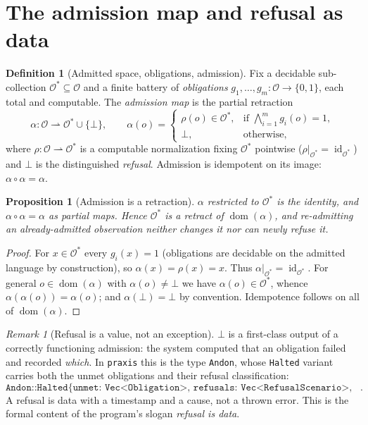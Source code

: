 \documentclass[11pt,oneside]{book}
\theoremstyle{definition}
\newtheorem{definition}{Definition}[chapter]
\theoremstyle{plain}
\newtheorem{proposition}[theorem]{Proposition}
\theoremstyle{remark}
\newtheorem*{remark}{Remark}
\newcommand{\Obs}{\mathcal{O}}                 %
\newcommand{\Adm}{\mathcal{O}^{*}}             %
\newcommand{\adm}{\alpha}                      %
\newcommand{\Rfsl}{\bot}                        %
\DeclareMathOperator{\dom}{dom}
\DeclareMathOperator{\id}{id}
\newcommand{\code}[1]{\texttt{#1}}
\begin{document}
\section{The admission map and refusal as data}

\begin{definition}[Admitted space, obligations, admission]\label{def:adm}
Fix a decidable sub-collection $\Adm\subseteq\Obs$ and a finite battery of \emph{obligations}
$g_{1},\dots,g_{m}:\Obs\to\{0,1\}$, each total and computable. The \emph{admission map} is
the partial retraction
\[
\adm:\Obs\rightharpoonup\Adm\cup\{\Rfsl\},\qquad
\adm(o)=
\begin{cases}
\rho(o)\in\Adm, & \text{if } \bigwedge_{i=1}^{m} g_{i}(o)=1,\\[2pt]
\Rfsl, & \text{otherwise,}
\end{cases}
\]
where $\rho:\Obs\rightharpoonup\Adm$ is a computable normalization fixing $\Adm$ pointwise
($\rho|_{\Adm}=\id_{\Adm}$) and $\Rfsl$ is the distinguished \emph{refusal}. Admission is
idempotent on its image: $\adm\circ\adm=\adm$.
\end{definition}

\begin{proposition}[Admission is a retraction]\label{prop:retract}
$\adm$ restricted to $\Adm$ is the identity, and $\adm\circ\adm=\adm$ as partial maps.
Hence $\Adm$ is a retract of $\dom(\adm)$, and re-admitting an already-admitted observation
neither changes it nor can newly refuse it.
\end{proposition}

\begin{proof}
For $x\in\Adm$ every $g_i(x)=1$ (obligations are decidable on the admitted language by
construction), so $\adm(x)=\rho(x)=x$. Thus $\adm|_{\Adm}=\id_{\Adm}$. For general
$o\in\dom(\adm)$ with $\adm(o)\neq\Rfsl$ we have $\adm(o)\in\Adm$, whence
$\adm(\adm(o))=\adm(o)$; and $\adm(\Rfsl)=\Rfsl$ by convention. Idempotence follows on all
of $\dom(\adm)$. \end{proof}

\begin{remark}[Refusal is a value, not an exception]
$\Rfsl$ is a first-class output of a correctly functioning admission: the system computed
that an obligation failed and recorded \emph{which}. In \code{praxis} this is the type
\code{Andon}, whose \code{Halted} variant carries both the unmet obligations and their
refusal classification:
\[
\code{Andon::Halted\{ unmet: Vec<Obligation>,\ refusals: Vec<RefusalScenario>,\ at: u64 \}}.
\]
A refusal is data with a timestamp and a cause, not a thrown error. This is the formal
content of the program's slogan \emph{refusal is data}.
\end{remark}
\end{document}
